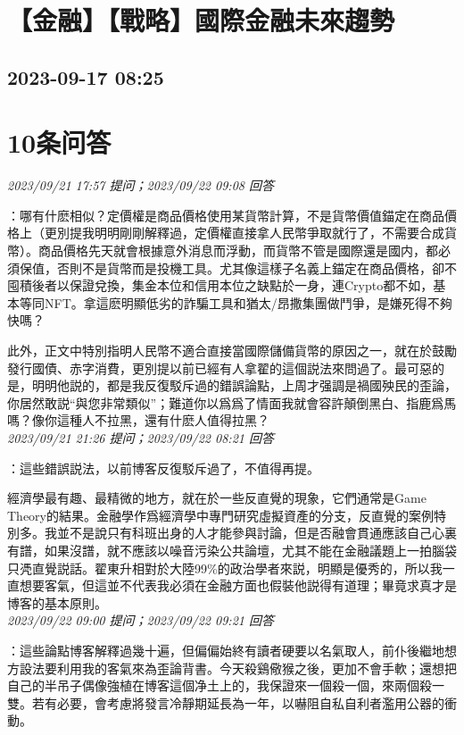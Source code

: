 \documentclass[twocolumn]{ctexart}
\begin{document}
\section{【金融】【戰略】國際金融未來趨勢}
\subsection{2023-09-17 08:25}


\section{10条问答}

\textit{\hfill\noindent\small 2023/09/21 17:57 提问；2023/09/22 09:08 回答}

：哪有什麽相似？定價權是商品價格使用某貨幣計算，不是貨幣價值錨定在商品價格上（更別提我明明剛剛解釋過，定價權直接拿人民幣爭取就行了，不需要合成貨幣）。商品價格先天就會根據意外消息而浮動，而貨幣不管是國際還是國内，都必須保值，否則不是貨幣而是投機工具。尤其像這樣子名義上錨定在商品價格，卻不囤積後者以保證兌換，集金本位和信用本位之缺點於一身，連Crypto都不如，基本等同NFT。拿這麽明顯低劣的詐騙工具和猶太/昂撒集團做鬥爭，是嫌死得不夠快嗎？

此外，正文中特別指明人民幣不適合直接當國際儲備貨幣的原因之一，就在於鼓勵發行國債、赤字消費，更別提以前已經有人拿翟的這個説法來問過了。最可惡的是，明明他説的，都是我反復駁斥過的錯誤論點，上周才强調是禍國殃民的歪論，你居然敢説“與您非常類似”；難道你以爲爲了情面我就會容許顛倒黑白、指鹿爲馬嗎？像你這種人不拉黑，還有什麽人值得拉黑？
\\

\textit{\hfill\noindent\small 2023/09/21 21:26 提问；2023/09/22 08:21 回答}

：這些錯誤説法，以前博客反復駁斥過了，不值得再提。

經濟學最有趣、最精微的地方，就在於一些反直覺的現象，它們通常是Game Theory的結果。金融學作爲經濟學中專門研究虛擬資產的分支，反直覺的案例特別多。我並不是說只有科班出身的人才能參與討論，但是否融會貫通應該自己心裏有譜，如果沒譜，就不應該以噪音污染公共論壇，尤其不能在金融議題上一拍腦袋只凴直覺説話。翟東升相對於大陸99\%的政治學者來説，明顯是優秀的，所以我一直想要客氣，但這並不代表我必須在金融方面也假裝他説得有道理；畢竟求真才是博客的基本原則。
\\

\textit{\hfill\noindent\small 2023/09/22 09:00 提问；2023/09/22 09:21 回答}

：這些論點博客解釋過幾十遍，但偏偏始終有讀者硬要以名氣取人，前仆後繼地想方設法要利用我的客氣來為歪論背書。今天殺鷄儆猴之後，更加不會手軟；還想把自己的半吊子偶像強植在博客這個净土上的，我保證來一個殺一個，來兩個殺一雙。若有必要，會考慮將發言冷靜期延長為一年，以嚇阻自私自利者濫用公器的衝動。
\\
\end{document}
